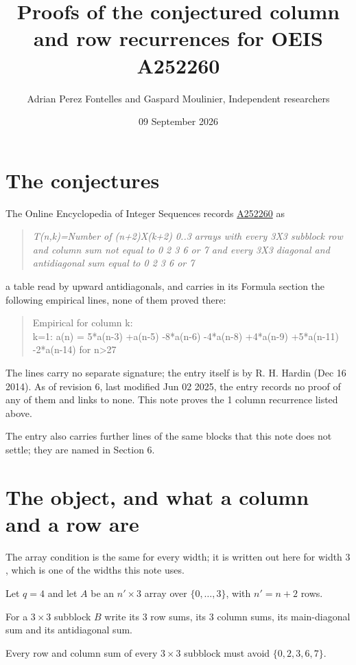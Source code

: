 \documentclass[11pt]{article}
\title{Proofs of the conjectured column and row recurrences for OEIS A252260}
\author{Adrian Perez Fontelles and Gaspard Moulinier, Independent researchers}
\date{09 September 2026}
\theoremstyle{definition}
\begin{document}
\maketitle
\section{The conjectures}

The Online Encyclopedia of Integer Sequences records \href{https://oeis.org/A252260}{A252260} as

\begin{quote}\itshape T(n,k)=Number of (n+2)X(k+2) 0..3 arrays with every 3X3 subblock row and column sum not equal to 0 2 3 6 or 7 and every 3X3 diagonal and antidiagonal sum equal to 0 2 3 6 or 7\end{quote}

a table read by upward antidiagonals, and carries in its Formula section the following empirical lines, none of them proved there:

\begin{quote}\ttfamily Empirical for column k:\\
k=1: a(n) = 5*a(n-3) +a(n-5) -8*a(n-6) -4*a(n-8) +4*a(n-9) +5*a(n-11) -2*a(n-14) for n>27\end{quote}

The lines carry no separate signature; the entry itself is by R. H. Hardin (Dec 16 2014). As of revision 6, last modified Jun 02 2025, the entry records no proof of any of them and links to none. This note proves the 1 column recurrence listed above.

The entry also carries further lines of the same blocks that this note does not settle; they are named in Section 6.

\section{The object, and what a column and a row are}

The array condition is the same for every width; it is written out here for width $3$, which is one of the widths this note uses.

Let $q = 4$ and let $A$ be an $n' \times 3$ array over $\{0,\dots,3\}$, with $n' = n + 2$ rows.

For a $3\times3$ subblock $B$ write its 3 row sums, its 3 column sums, its main-diagonal sum and its antidiagonal sum.

Every row and column sum of every $3\times3$ subblock must avoid $\{0, 2, 3, 6, 7\}$.
\end{document}
